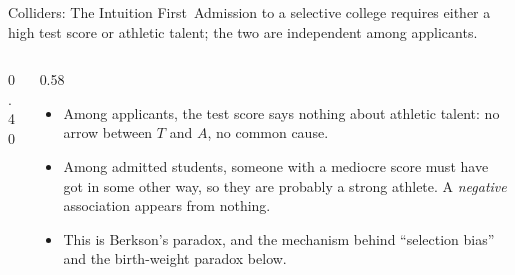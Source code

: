\documentclass[aspectratio=169,11pt,xcolor=dvipsnames]{beamer}
\newcommand{\core}{\,\raisebox{0.6pt}{\textcolor{corestar}{$\bigstar$}}}
\begin{document}
\begin{frame}{Colliders: The Intuition First\core}
Admission to a selective college requires either a high test score or
athletic talent; the two are independent among applicants.
\begin{columns}[c]
\begin{column}{0.40\textwidth}
\centering
{}
\end{column}
\begin{column}{0.58\textwidth}
\begin{itemize}\itemsep3pt
  \item Among applicants, the test score says nothing about athletic
        talent: no arrow between $T$ and $A$, no common cause.
  \item \alert{Among admitted students}, someone with a mediocre score must
        have got in some other way, so they are probably a strong athlete.
        A \emph{negative} association appears from nothing.
  \item This is Berkson's paradox, and the mechanism behind ``selection
        bias'' and the birth-weight paradox below.
\end{itemize}
\end{column}
\end{columns}
\end{frame}
\end{document}
